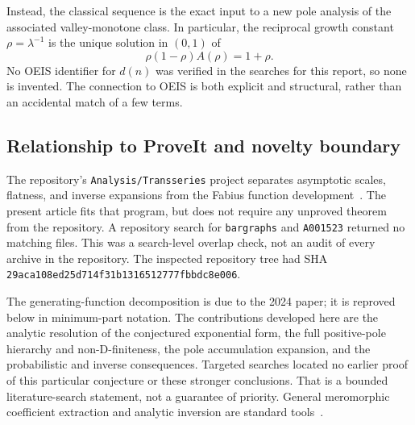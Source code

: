 \documentclass[11pt,a4paper]{article}
\numberwithin{equation}{section}
\theoremstyle{definition}\newtheorem{definition}[theorem]{Definition}
\theoremstyle{remark}\newtheorem{remark}[theorem]{Remark}
\begin{document}
Instead, the classical sequence is the exact input to a new pole
analysis of the associated valley-monotone class. In particular, the
reciprocal growth constant \(\rho=\lambda^{-1}\) is the unique solution
in \((0,1)\) of
\begin{equation}\label{vmb:eq:OEISroot}
\boxed{\quad \rho(1-\rho)A(\rho)=1+\rho.\quad}
\end{equation}
No OEIS identifier for \(d(n)\) was verified in the searches for this
report, so none is invented. The connection to OEIS is both explicit and
structural, rather than an accidental match of a few terms.

\subsection{Relationship to ProveIt and novelty boundary}
The repository's \texttt{Analysis/Transseries} project separates
asymptotic scales, flatness, and inverse expansions from the Fabius
function development~\cite{ProveIt}. The present article fits that
program, but does not require any unproved theorem from the repository.
A repository search for \texttt{bargraphs} and \texttt{A001523} returned
no matching files. This was a search-level overlap check, not an audit of
every archive in the repository. The inspected repository tree had SHA
\texttt{29aca108ed25d714f31b1316512777fbbdc8e006}.

The generating-function decomposition is due to the 2024 paper; it is
reproved below in minimum-part notation. The contributions developed
here are the analytic resolution of the conjectured exponential form,
the full positive-pole hierarchy and non-D-finiteness, the pole
accumulation expansion, and the probabilistic and inverse consequences.
Targeted searches located no earlier proof of this particular conjecture
or these stronger conclusions. That is a bounded literature-search
statement, not a guarantee of priority. General meromorphic coefficient
extraction and analytic inversion are standard tools~\cite{FS}.
\end{document}
